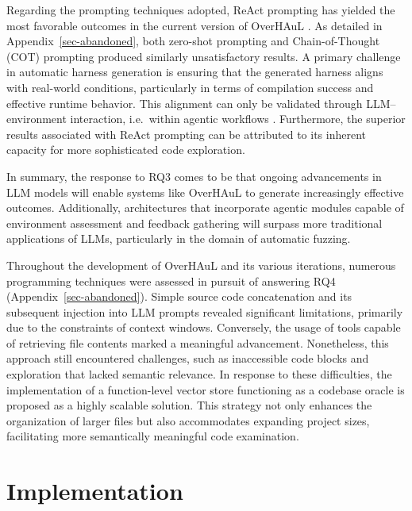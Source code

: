\documentclass[
  a4paper,
]{scrreprt}
\theoremstyle{definition}
\theoremstyle{remark}
\begin{document}
Regarding the prompting techniques adopted, ReAct prompting has yielded
the most favorable outcomes in the current version of OverHAuL
\autocite{reAct}. As detailed in Appendix~\ref{sec-abandoned}, both
zero-shot prompting and Chain-of-Thought (COT) prompting
\autocite{chainofthought} produced similarly unsatisfactory results. A
primary challenge in automatic harness generation is ensuring that the
generated harness aligns with real-world conditions, particularly in
terms of compilation success and effective runtime behavior. This
alignment can only be validated through LLM--environment interaction,
i.e.~within agentic workflows \autocite{giannone2025}. Furthermore, the
superior results associated with ReAct prompting can be attributed to
its inherent capacity for more sophisticated code exploration.

In summary, the response to RQ3 comes to be that ongoing advancements in
LLM models will enable systems like OverHAuL to generate increasingly
effective outcomes. Additionally, architectures that incorporate agentic
modules capable of environment assessment and feedback gathering will
surpass more traditional applications of LLMs, particularly in the
domain of automatic fuzzing.

Throughout the development of OverHAuL and its various iterations,
numerous programming techniques were assessed in pursuit of answering
RQ4 (Appendix~\ref{sec-abandoned}). Simple source code concatenation and
its subsequent injection into LLM prompts revealed significant
limitations, primarily due to the constraints of context windows.
Conversely, the usage of tools capable of retrieving file contents
marked a meaningful advancement. Nonetheless, this approach still
encountered challenges, such as inaccessible code blocks and exploration
that lacked semantic relevance. In response to these difficulties, the
implementation of a function-level vector store functioning as a
codebase oracle is proposed as a highly scalable solution. This strategy
not only enhances the organization of larger files but also accommodates
expanding project sizes, facilitating more semantically meaningful code
examination.


\chapter{Implementation}\label{sec-implementation}
\end{document}
